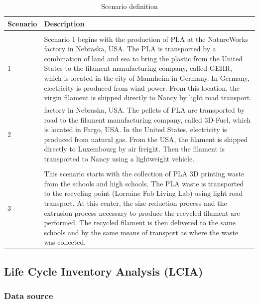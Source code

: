 \documentclass[12pt]{elsarticle} %
\begin{document}
\begin{longtable}[t]{>{\raggedright\arraybackslash}p{1cm}>{\raggedright\arraybackslash}p{14cm}}
\caption{\label{tab:Table1}Scenario definition}\\
\toprule
Scenario & Description\\
\midrule
\addlinespace[1em]
\multicolumn{2}{l}{\textbf{Virgin Filament}}\\
\hspace{1em}1 & Scenario 1 begins with the production of PLA at the NatureWorks factory in Nebraska, USA. The PLA is transported by a combination of land and sea to bring the plastic from the United States to the filament manufacturing company, called GEHR, which is located in the city of Mannheim in Germany. In Germany, electricity is produced from wind power. From this location, the virgin filament is shipped directly to Nancy by light road transport.\\
\hspace{1em}2 & factory in Nebraska, USA. The pellets of PLA are transported by road to the filament manufacturing company, called 3D-Fuel, which is located in Fargo, USA. In the United States, electricity is produced from natural gas. From the USA, the filament is shipped directly to Luxembourg by air freight. Then the filament is transported to Nancy using a lightweight vehicle.\\
\midrule
\addlinespace[1em]
\multicolumn{2}{l}{\textbf{Recycled Filament}}\\
\hspace{1em}3 & This scenario starts with the collection of PLA 3D printing waste from the schools and high schools. The PLA waste is transported to the recycling point (Lorraine Fab Living Lab) using light road transport. At this center, the size reduction process and the extrusion process necessary to produce the recycled filament are performed. The recycled filament is then delivered to the same schools and by the same means of transport as where the waste was collected.\\
\bottomrule
\end{longtable}
\endgroup{}

\hypertarget{life-cycle-inventory-analysis-lcia}{%
\subsection{Life Cycle Inventory Analysis (LCIA)}\label{life-cycle-inventory-analysis-lcia}}

\hypertarget{data-source}{%
\subsubsection{Data source}\label{data-source}}
\end{document}
